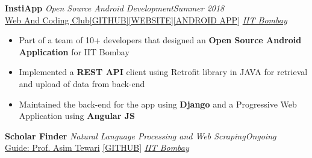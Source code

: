 \documentclass[10pt]{article}
\def\projectSpace{\vspace{-5pt}}
\def\projectFirstSpace{\vspace{-18pt}}
\begin{document}
\hspace*{-18 pt}
 \textbf{\large InstiApp} \textemdash \textit{Open Source Android Development}\hfill{\sl \small Summer 2018}\\
 \href{https://www.wncc-iitb.org}{Web And Coding Club}\hspace{10pt}\href{https://github.com/wncc/InstiApp}{[GITHUB]}\hspace{3pt}\href{https:/insti.app}{[WEBSITE]}\hspace{3pt}\href{https://play.google.com/store/apps/details?id=app.insti&hl=en_US}{[ANDROID APP]}
 \hfill{\sl \small \href{http://www.iitb.ac.in/}{IIT Bombay}\\ }
\vspace{1pt}
\projectFirstSpace
\begin{itemize}[itemsep = -0.75 mm, leftmargin=*]


  \item Part of a team of 10+ developers that designed an {\bf Open Source Android Application} for IIT Bombay
    \item Implemented a {\bf REST API} client using  Retrofit library in JAVA for retrieval and upload of data from back-end
    \item Maintained the back-end for the app using {\bf Django} and  a Progressive Web Application using {\bf Angular JS}

\end{itemize}
\vspace*{8pt}

\projectSpace

\hspace*{-18 pt}
 \textbf{\large Scholar Finder} \textemdash \textit{Natural Language Processing and Web Scraping}\hfill{\sl \small Ongoing}\\
 \href{https://www.asimtewari.com}{Guide: Prof. Asim Tewari} \hspace{10pt}\href{https://github.com/yashkhem1/Scholar-Finder}{[GITHUB]} \hfill{\sl \small \href{http://www.iitb.ac.in/}{IIT Bombay}\ \ }\\
 \vspace{1pt}
\end{document}
